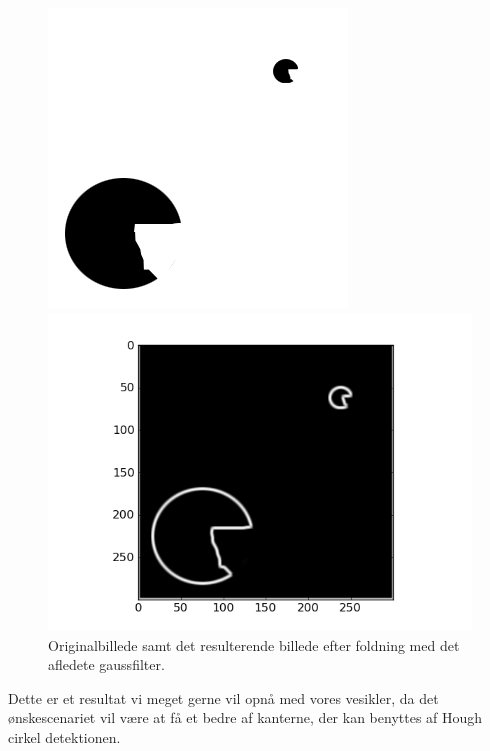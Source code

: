 \begin{figure}[H]
	\begin{minipage}[b]{0.5\linewidth}
		\centering
		\includegraphics[scale=1.3]{files/premethod/img/gauss_derived_circ1.png}
	\end{minipage}
	\hspace{0.5cm}
	\begin{minipage}[b]{0.5\linewidth}
		\centering
		\includegraphics[scale=0.5]{files/premethod/img/gauss_derived_circ2.png}
	\end{minipage}
	\caption{Originalbillede samt det resulterende billede efter foldning med det afledete gaussfilter.\label{fig:premethod_gaussCirc}}
\end{figure}

Dette er et resultat vi meget gerne vil opnå med vores vesikler, da det ønskescenariet vil være at få et bedre af kanterne, der kan benyttes af Hough cirkel detektionen.

